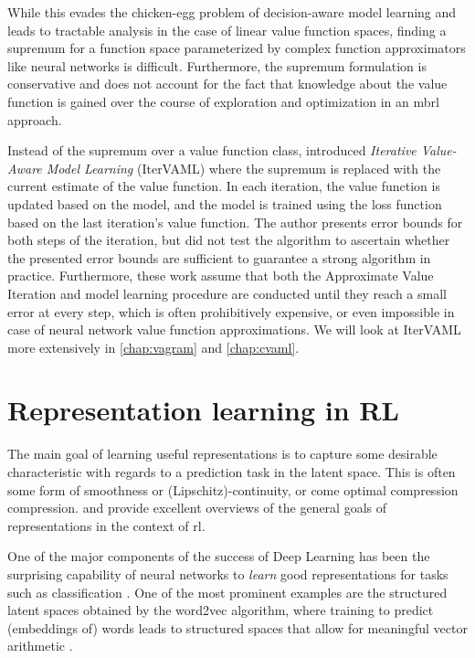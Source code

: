 While this evades the chicken-egg problem of decision-aware model learning and leads to tractable analysis in the case of linear value function spaces, finding a supremum for a function space parameterized by complex function approximators like neural networks is difficult.
Furthermore, the supremum formulation is conservative and does not account for the fact that knowledge about the value function is gained over the course of exploration and optimization in an \ac{mbrl} approach.

Instead of the supremum over a value function class, \textcite{itervaml} introduced \emph{Iterative Value-Aware Model Learning} (IterVAML) where the supremum is replaced with the current estimate of the value function.
In each iteration, the value function is updated based on the model, and the model is trained using the loss function based on the last iteration's value function.
The author presents error bounds for both steps of the iteration, but did not test the algorithm to ascertain whether the presented error bounds are sufficient to guarantee a strong algorithm in practice. 
Furthermore, these work assume that both the Approximate Value Iteration and model learning procedure are conducted until they reach a small error at every step, which is often prohibitively expensive, or even impossible in case of neural network value function approximations.
We will look at IterVAML more extensively in \autoref{chap:vagram} and \autoref{chap:cvaml}.



\section{Representation learning in RL}

The main goal of learning useful representations is to capture some desirable characteristic with regards to a prediction task in the latent space.
This is often some form of smoothness or (Lipschitz)-continuity, or come optimal compression compression.
\textcite{abel2020thesis} and \textcite{le2021metrics} provide excellent overviews of the general goals of representations in the context of \ac{rl}.

One of the major components of the success of Deep Learning has been the surprising capability of neural networks to \emph{learn} good representations for tasks such as classification \parencite{bengio2012representation}.
One of the most prominent examples are the structured latent spaces obtained by the word2vec algorithm, where training to predict (embeddings of) words leads to structured spaces that allow for meaningful vector arithmetic \parencite{mikolov2013distributed,goldberg2014word2vec}.

